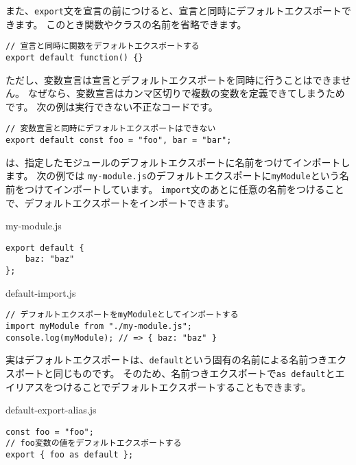 また、\texttt{export}文を宣言の前につけると、宣言と同時にデフォルトエクスポートできます。
このとき関数やクラスの名前を省略できます。

\begin{lstlisting}
// 宣言と同時に関数をデフォルトエクスポートする
export default function() {}
\end{lstlisting}

ただし、変数宣言は宣言とデフォルトエクスポートを同時に行うことはできません。
なぜなら、変数宣言はカンマ区切りで複数の変数を定義できてしまうためです。
次の例は実行できない不正なコードです。

\begin{lstlisting}
// 変数宣言と同時にデフォルトエクスポートはできない
export default const foo = "foo", bar = "bar";
\end{lstlisting}

\textbf{}は、指定したモジュールのデフォルトエクスポートに名前をつけてインポートします。
次の例では
\texttt{my-module.js}のデフォルトエクスポートに\texttt{myModule}という名前をつけてインポートしています。
\texttt{import}文のあとに任意の名前をつけることで、デフォルトエクスポートをインポートできます。

\begin{listtitle}
my-module.js
\end{listtitle}
\begin{lstlisting}
export default {
    baz: "baz"
};
\end{lstlisting}
\listend

\begin{listtitle}
default-import.js
\end{listtitle}
\begin{lstlisting}
// デフォルトエクスポートをmyModuleとしてインポートする
import myModule from "./my-module.js";
console.log(myModule); // => { baz: "baz" }
\end{lstlisting}
\listend

実はデフォルトエクスポートは、\texttt{default}という固有の名前による名前つきエクスポートと同じものです。
そのため、名前つきエクスポートで\texttt{as default}とエイリアスをつけることでデフォルトエクスポートすることもできます。

\begin{listtitle}
default-export-alias.js
\end{listtitle}
\begin{lstlisting}
const foo = "foo";
// foo変数の値をデフォルトエクスポートする
export { foo as default };
\end{lstlisting}
\listend


